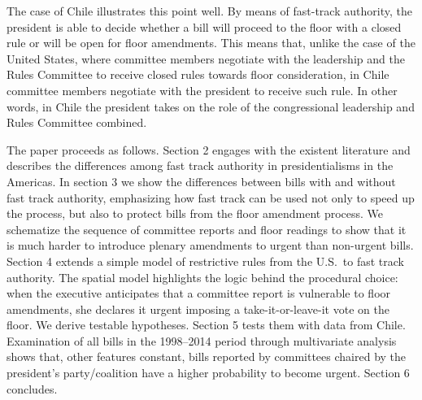\documentclass[letter,12pt]{article}
\begin{document}
The case of Chile illustrates this point well. By means of fast-track authority, the president is able to decide whether a bill will proceed to the floor with a closed rule or will be open for floor amendments. This means that, unlike the case of the United States, where committee members negotiate with the leadership and the Rules Committee to receive closed rules towards floor consideration, in Chile committee members negotiate with the president to receive such rule. In other words, in Chile the president takes on the role of the congressional leadership and Rules Committee combined. 



The paper proceeds as follows. Section 2 engages with the existent literature and describes the differences among fast track authority in presidentialisms in the Americas.  In section 3 we show the differences between bills with and without fast track authority, emphasizing how fast track can be used not only to speed up the process, but also to protect bills from the floor amendment process.  We schematize the sequence of committee reports and floor readings to show that it is much harder to introduce plenary amendments to urgent than non-urgent bills. Section 4 extends a simple model of restrictive rules from the U.S.\ to fast track authority. The spatial model highlights the logic behind the procedural choice: when the executive anticipates that a committee report is vulnerable to floor amendments, she declares it urgent imposing a take-it-or-leave-it vote on the floor. We derive testable hypotheses. Section 5 tests them with data from Chile. Examination of all bills in the 1998--2014 period through multivariate analysis shows that, other features constant, bills reported by committees chaired by the president's party/coalition have a higher probability to become urgent. Section 6 concludes. 
\end{document}
